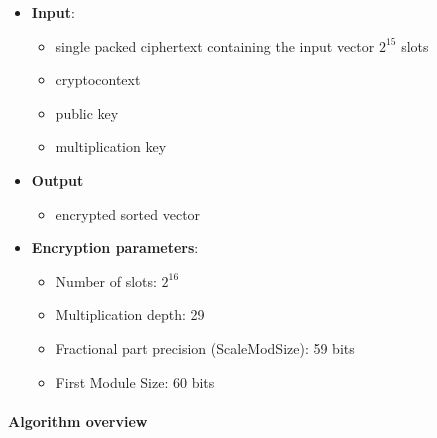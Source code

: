 \documentclass[article]{iacrtrans}
\begin{document}
 \begin{itemize}
    \item \textbf{Input}: 
        \begin{itemize}
            \item single packed ciphertext containing the input vector $2^{15}$ slots
            \item cryptocontext
            \item public key
            \item multiplication key
        \end{itemize}
    \item \textbf{Output}
        \begin{itemize}
            \item encrypted sorted vector
        \end{itemize}
    \item \textbf{Encryption parameters}:
        \begin{itemize}
            \item Number of slots: $2^{16}$ 
            \item Multiplication depth: 29
            \item Fractional part precision (ScaleModSize): 59 bits
            \item First Module Size: 60 bits
        \end{itemize}
\end{itemize}
    
\paragraph{Algorithm overview}\mbox{}\\
\end{document}
